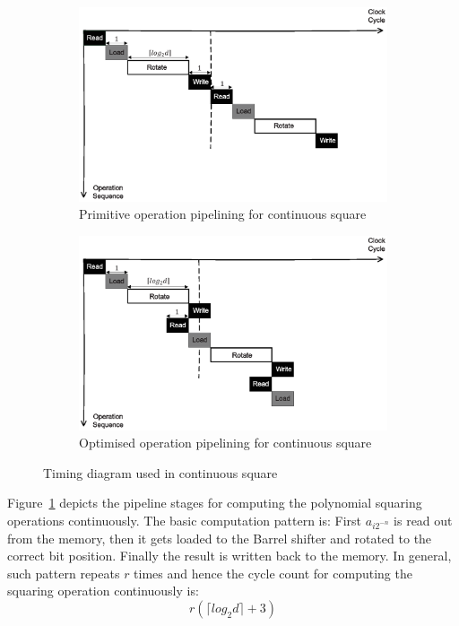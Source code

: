 \documentclass[runningheads]{llncs}
\begin{document}
\begin{figure}[htb]
\centering
\begin{subfigure}[t]{0.45\textwidth}\centering
\includegraphics[width=\textwidth]{./fig/pipeline_square.eps}
\caption{Primitive operation pipelining for continuous square}
\label{fig:pipeline_squ}
\end{subfigure}
\hspace{1em}
\begin{subfigure}[t]{0.45\textwidth}\centering
\includegraphics[width=\textwidth]{./fig/pipeline_square2.eps}
\caption{Optimised operation pipelining for continuous square }
\label{fig:pipeline_squ2}
\end{subfigure}
\caption{Timing diagram used in continuous square}
\end{figure}




Figure~\ref{fig:pipeline_squ} depicts the pipeline stages for computing the
polynomial squaring operations continuously.
The basic computation pattern is:
First $a_{i2^{-n}}$ is read out from the memory,
then it gets loaded to the Barrel shifter and rotated to the correct bit position.
Finally the result is written back to the memory.
In general, such pattern repeats $r$ times and
hence the cycle count for computing the squaring operation continuously is:
\[
r(\lceil log_2d\rceil+3)
\]
\end{document}
